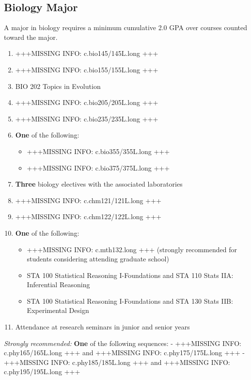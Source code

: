 \documentclass[
  letterpaper,
]{scrbook}
\providecommand{\tightlist}{%
  \setlength{\itemsep}{0pt}\setlength{\parskip}{0pt}}
\begin{document}
\subsection{Biology Major}\label{biology-major}

A major in biology requires a minimum cumulative 2.0 GPA over courses
counted toward the major.

\begin{enumerate}
\def\labelenumi{\arabic{enumi}.}
\tightlist
\item
  +++MISSING INFO: c.bio145/145L.long +++
\item
  +++MISSING INFO: c.bio155/155L.long +++
\item
  BIO 202 Topics in Evolution
\item
  +++MISSING INFO: c.bio205/205L.long +++
\item
  +++MISSING INFO: c.bio235/235L.long +++
\item
  \textbf{One} of the following:

  \begin{itemize}
  \tightlist
  \item
    +++MISSING INFO: c.bio355/355L.long +++
  \item
    +++MISSING INFO: c.bio375/375L.long +++
  \end{itemize}
\item
  \textbf{Three} biology electives with the associated laboratories
\item
  +++MISSING INFO: c.chm121/121L.long +++
\item
  +++MISSING INFO: c.chm122/122L.long +++
\item
  \textbf{One} of the following:

  \begin{itemize}
  \tightlist
  \item
    +++MISSING INFO: c.mth132.long +++ (strongly recommended for
    students considering attending graduate school)
  \item
    STA 100 Statistical Reasoning I-Foundations and STA 110 Stats IIA:
    Inferential Reasoning
  \item
    STA 100 Statistical Reasoning I-Foundations and STA 130 Stats IIB:
    Experimental Design
  \end{itemize}
\item
  Attendance at research seminars in junior and senior years
\end{enumerate}

\emph{Strongly recommended:} \textbf{One} of the following sequences: -
+++MISSING INFO: c.phy165/165L.long +++ and +++MISSING INFO:
c.phy175/175L.long +++ - +++MISSING INFO: c.phy185/185L.long +++ and
+++MISSING INFO: c.phy195/195L.long +++
\end{document}
